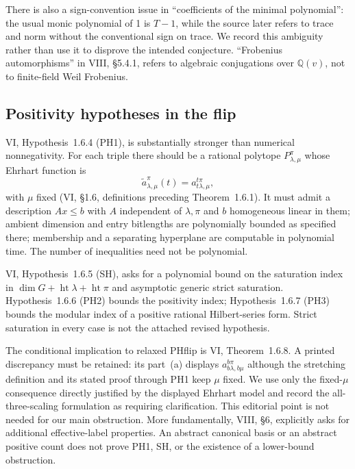 \documentclass[11pt,a4paper]{article}
\newcommand{\Q}{\mathbb Q}\newcommand{\Z}{\mathbb Z}\newcommand{\C}{\mathbb C}\newcommand{\N}{\mathbb N}\newcommand{\F}{\mathbb F}
\theoremstyle{named}\newtheorem{finding}{Finding}[section]
\theoremstyle{definition}\newtheorem{definition}[finding]{Definition}
\theoremstyle{remark}\newtheorem{remark}[finding]{Remark}
\begin{document}
There is also a sign-convention issue in ``coefficients of the minimal polynomial'': the usual monic polynomial of 1 is $T-1$, while the source later refers to trace and norm without the conventional sign on trace. We record this ambiguity rather than use it to disprove the intended conjecture. ``Frobenius automorphisms'' in VIII, \S5.4.1, refers to algebraic conjugations over $\Q(v)$, not to finite-field Weil Frobenius.

\subsection{Positivity hypotheses in the flip}
VI, Hypothesis~1.6.4 (PH1), is substantially stronger than numerical nonnegativity. For each triple there should be a rational polytope $P_{\lambda,\mu}^{\pi}$ whose Ehrhart function is
\[
 \widetilde a_{\lambda,\mu}^{\pi}(t)=a_{t\lambda,\mu}^{t\pi},
\]
with $\mu$ fixed (VI, \S1.6, definitions preceding Theorem~1.6.1). It must admit a description $Ax\le b$ with $A$ independent of $\lambda,\pi$ and $b$ homogeneous linear in them; ambient dimension and entry bitlengths are polynomially bounded as specified there; membership and a separating hyperplane are computable in polynomial time. The number of inequalities need not be polynomial.

VI, Hypothesis~1.6.5 (SH), asks for a polynomial bound on the saturation index in $\dim G+\operatorname{ht}\lambda+\operatorname{ht}\pi$ and asymptotic generic strict saturation. Hypothesis~1.6.6 (PH2) bounds the positivity index; Hypothesis~1.6.7 (PH3) bounds the modular index of a positive rational Hilbert-series form. Strict saturation in every case is not the attached revised hypothesis.

The conditional implication to relaxed PHflip is VI, Theorem~1.6.8. A printed discrepancy must be retained: its part~(a) displays $a_{b\lambda,b\mu}^{b\pi}$ although the stretching definition and its stated proof through PH1 keep $\mu$ fixed. We use only the fixed-$\mu$ consequence directly justified by the displayed Ehrhart model and record the all-three-scaling formulation as requiring clarification. This editorial point is not needed for our main obstruction. More fundamentally, VIII, \S6, explicitly asks for additional effective-label properties. An abstract canonical basis or an abstract positive count does not prove PH1, SH, or the existence of a lower-bound obstruction.
\end{document}
